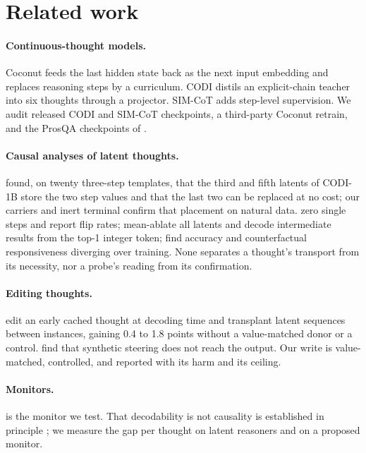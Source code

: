 \documentclass{article}
\begin{document}
\section{Related work}

\paragraph{Continuous-thought models.} Coconut feeds the last hidden state back as the next input embedding and replaces reasoning steps by a curriculum. CODI distils an explicit-chain teacher into six thoughts through a projector. SIM-CoT adds step-level supervision. We audit released CODI and SIM-CoT checkpoints, a third-party Coconut retrain, and the ProsQA checkpoints of \citet{dilgren2026interpretable}.

\paragraph{Causal analyses of latent thoughts.} \citet{cywinski2025} found, on twenty three-step templates, that the third and fifth latents of CODI-1B store the two step values and that the last two can be replaced at no cost; our carriers and inert terminal confirm that placement on natural data. \citet{li2026dynamics} zero single steps and report flip rates; \citet{dilgren2026interpretable} mean-ablate all latents and decode intermediate results from the top-1 integer token; \citet{jin2026final} find accuracy and counterfactual responsiveness diverging over training. None separates a thought's transport from its necessity, nor a probe's reading from its confirmation.

\paragraph{Editing thoughts.} \citet{chang2026unlocking} edit an early cached thought at decoding time and transplant latent sequences between instances, gaining 0.4 to 1.8 points without a value-matched donor or a control. \citet{huang2026steering} find that synthetic steering does not reach the output. Our write is value-matched, controlled, and reported with its harm and its ceiling.

\paragraph{Monitors.} \citet{ramjee2026ulterior} is the monitor we test. That decodability is not causality is established in principle \citep{openproblems2025,decodability2026}; we measure the gap per thought on latent reasoners and on a proposed monitor.
\end{document}
